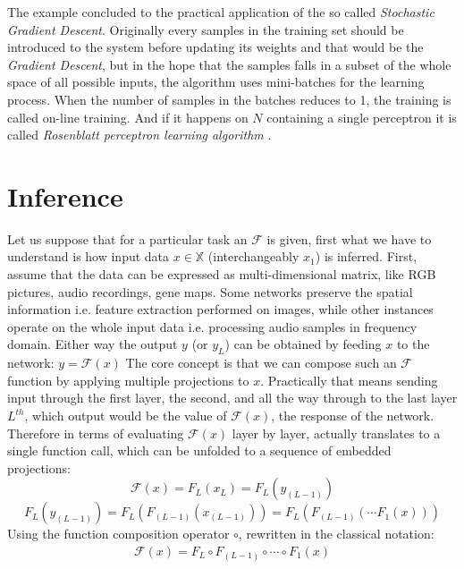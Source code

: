 The example concluded to the practical application of the so called \emph{Stochastic Gradient Descent}. Originally every samples in the training set should be introduced to the system before updating its weights and that would be the \emph{Gradient Descent}, but in  the hope that the samples falls in a subset of the whole space of all possible inputs, the algorithm uses mini-batches for the learning process. When the number of samples in the batches reduces to 1, the training is called on-line training. And if it happens on $N$ containing a single perceptron it is called \emph{Rosenblatt perceptron learning algorithm} .


\section{Inference}
Let us suppose that for a particular task an $\mathcal{F}$ is given, first what we have to understand is how input data 
$x \in \mathbb{X}$ (interchangeably $x_1$) is inferred.
First, assume that the data can be expressed as multi-dimensional matrix, like RGB pictures, audio recordings, gene maps.
Some networks preserve the spatial information i.e. feature extraction performed on images, 
while other instances operate on the whole input data i.e. processing audio samples in frequency domain.
Either way the output $y$ (or $y_L$) can be obtained by feeding $x$ to the network: 
$ y = \mathcal{F}(x)$
The core concept is that we can compose such an $\mathcal{F}$ function by applying multiple projections to $x$.
Practically that means sending input through the first layer, the second, and all the way through to the last layer $L^{th}$, which output would be the value of $\mathcal{F}(x)$, the response of the network.
Therefore in terms of evaluating $\mathcal{F}(x)$ layer by layer, actually translates to a single function call, which can be unfolded to a sequence of embedded projections:
$$
    \mathcal{F}(x) = F_L \left( x_L \right) = F_L \left( y_{(L-1)} \right)
$$
$$
    F_L \left( y_{(L-1)} \right) = 
    F_L \left( F_{(L-1)} \left( x_{(L-1)} \right) \right) = F_L \left( F_{(L-1)}\left( \cdots F_1(x)\right)\right)
$$
Using the function composition operator $\circ$, rewritten in the classical notation:
\begin{equation}\label{eq:forward}
\begin{split}
    \mathcal{F}(x) = F_L \circ F_{(L-1)} \circ \cdots \circ F_1(x)
\end{split}
\end{equation}


